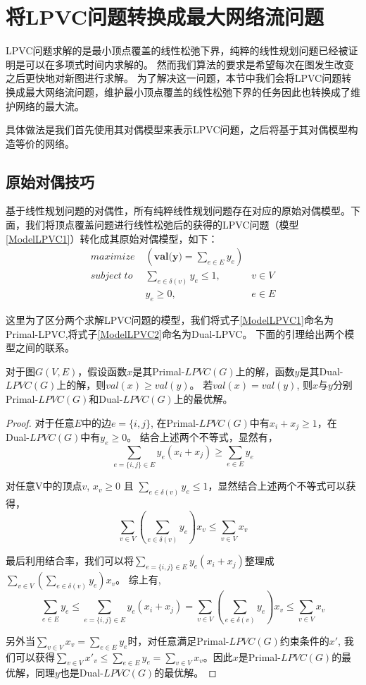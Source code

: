 
\section{将LPVC问题转换成最大网络流问题}

LPVC问题求解的是最小顶点覆盖的线性松弛下界，纯粹的线性规划问题已经被证明是可以在多项式时间内求解的。
然而我们算法的要求是希望每次在图发生改变之后更快地对新图进行求解。
为了解决这一问题，本节中我们会将LPVC问题转换成最大网络流问题，维护最小顶点覆盖的线性松弛下界的任务因此也转换成了维护网络的最大流。

具体做法是我们首先使用其对偶模型来表示LPVC问题，之后将基于其对偶模型构造等价的网络。

\subsection{原始对偶技巧}
基于线性规划问题的对偶性，所有纯粹线性规划问题存在对应的原始对偶模型。下面，我们将顶点覆盖问题进行线性松弛后的获得的LPVC问题（模型\ref{ModelLPVC1}）转化成其原始对偶模型，如下：
\begin{equation} \label{ModelLPVC2} \begin{aligned}
  maximize\; & (\textbf{val(y)} = \sum_{e \in E}{y_e}) &\\
  subject\; to\; & \sum_{e \in \delta(v)}{y_e \le 1}, & v \in V \\
   & y_e \ge 0, & e \in E
\end{aligned} \end{equation}

这里为了区分两个求解LPVC问题的模型，我们将式子\ref{ModelLPVC1}命名为Primal-LPVC,将式子\ref{ModelLPVC2}命名为Dual-LPVC。
下面的引理给出两个模型之间的联系。
\begin{lemma} \label{relationBwtPrimalAndDual}
对于图$G(V, E)$，假设函数$x$是其Primal-$LPVC(G)$上的解，函数$y$是其Dual-$LPVC(G)$上的解，则$val(x) \ge val(y)$。
若$val(x) = val(y)$, 则$x$与$y$分别Primal-$LPVC(G)$和Dual-$LPVC(G)$上的最优解。
\end{lemma}
\begin{proof}
  对于任意$E$中的边$e = \{i, j\}$, 在Primal-$LPVC(G)$中有$x_i + x_j \ge 1$，在Dual-$LPVC(G)$中有$y_e \ge 0$。
  结合上述两个不等式，显然有，\[\sum\limits_{e=\{i, j\} \in E}{y_e(x_i + x_j)} \ge \sum\limits_{e \in E}{y_e}\]

  对任意V中的顶点$v$, $x_v \ge 0$ 且 $\sum_{e \in \delta(v)}{y_e} \le 1$，显然结合上述两个不等式可以获得，
  \[\sum\limits_{v \in V}{(\sum\limits_{e \in \delta(v)}{y_e})x_v} \le \sum\limits_{v \in V}{x_v}\]

  最后利用结合率，我们可以将$\sum_{e=\{i, j\} \in E}{y_e(x_i + x_j)}$整理成$\sum_{v \in V}{(\sum_{e \in \delta(v)}{y_e})x_v}$。
  综上有,
  \[
    \sum_{e \in E}{y_e} \le \sum_{e=\{i, j\} \in E}{y_e(x_i + x_j)}  = \sum_{v \in V}{(\sum_{e \in \delta(v)}{y_e})x_v} \le \sum_{v \in V}{x_v}
  \]

  另外当$\sum\limits_{v \in V}{x_v} = \sum\limits_{e \in E}{y_e}$时，对任意满足Primal-$LPVC(G)$约束条件的$x'$,
  我们可以获得$\sum\limits_{v \in V}{x'_v} \le \sum\limits_{e \in E}{y_e} = \sum\limits_{v \in V}{x_v}$。因此$x$是Primal-$LPVC(G)$的最优解，同理$y$也是Dual-$LPVC(G)$的最优解。
\end{proof}

